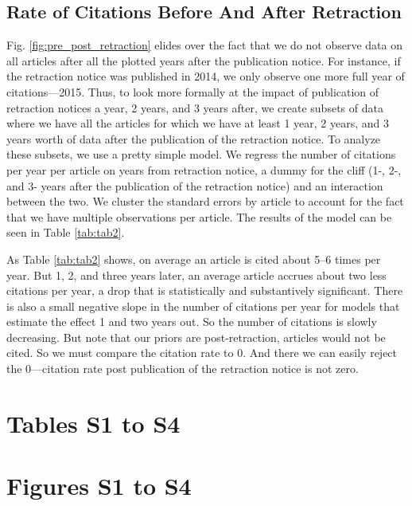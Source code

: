 \documentclass[12pt]{article}
\begin{document}
\subsection{Rate of Citations Before And After Retraction}
Fig. \ref{fig:pre_post_retraction} elides over the fact that we do not observe data on all articles after all the plotted years after the publication notice. For instance, if the retraction notice was published in 2014, we only observe one more full year of citations---2015. Thus, to look more formally at the impact of publication of retraction notices a year, 2 years, and 3 years after, we create subsets of data where we have all the articles for which we have at least 1 year, 2 years, and 3 years worth of data after the publication of the retraction notice. To analyze these subsets, we use a pretty simple model. We regress the number of citations per year per article on years from retraction notice, a dummy for the cliff (1-, 2-, and 3- years after the publication of the retraction notice) and an interaction between the two. We cluster the standard errors by article to account for the fact that we have multiple observations per article. The results of the model can be seen in Table \ref{tab:tab2}.

As Table \ref{tab:tab2} shows, on average an article is cited about 5--6 times per year. But 1, 2, and three years later, an average article accrues about two less citations per year, a drop that is statistically and substantively significant. There is also a small negative slope in the number of citations per year for models that estimate the effect 1 and two years out. So the number of citations is slowly decreasing. But note that our priors are post-retraction, articles would not be cited. So we must compare the citation rate to 0. And there we can easily reject the 0---citation rate post publication of the retraction notice is not zero.  

\section{Tables S1 to S4}









\section{Figures S1 to S4}
\end{document}
